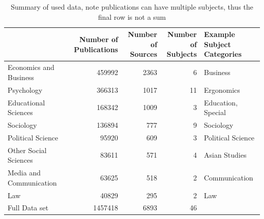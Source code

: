 \documentclass[12pt, a4paper]{article}
\begin{document}
\begin{table}[h]
	\centering
	\begin{adjustbox}{center}
		\begin{tabular}{lrrrl}
			\toprule
			{} &  \pbox{20cm}{Number of \\Publications}  &  \pbox{20cm}{Number of\\Sources}&  \pbox{20cm}{Number of \\Subjects} &   \pbox{20cm}{Example Subject\\Categories} \\
			\midrule
			Economics and Business  &            \num{459992} &              \num{2363} &                  \num{6} &            Business \\
			Psychology              &            \num{366313} &              \num{1017} &                 \num{11} &          Ergonomics \\
			Educational Sciences    &            \num{168342} &              \num{1009} &                  \num{3} &  Education, Special \\
			Sociology               &            \num{136894} &               \num{777} &                  \num{9} &           Sociology \\
			Political Science       &             \num{95920} &               \num{609} &                  \num{3} &   Political Science \\
			Other Social Sciences   &             \num{83611} &               \num{571} &                  \num{4} &       Asian Studies \\
			Media and Communication &             \num{63625} &               \num{518} &                  \num{2} &       Communication \\
			Law                     &             \num{40829} &               \num{295} &                  \num{2} &                 Law \\
			\midrule
			Full Data set           &           \num{1457418} &              \num{6893} &                 \num{46} &                     \\
			\bottomrule
		\end{tabular}
	\end{adjustbox}
	\caption{Summary of used data, note publications can have multiple subjects, thus the final row is not a sum}\label{sum_1}
\end{table}
\end{document}
